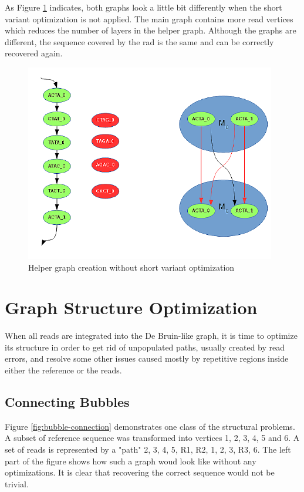As Figure \ref{fig:helper-graph} indicates, both graphs look a little bit differently when the short variant optimization is not applied. The main graph contains more read vertices which reduces the number of layers in the helper graph. Although the graphs are different, the sequence covered by the rad is the same and can be correctly recovered again.

\begin{figure}[h]
	\centering
	\includegraphics{img/helper-graph.pdf}
	\caption{Helper graph creation without short variant optimization}
	\label{fig:helper-graph}
\end{figure}

\section{Graph Structure Optimization}
\label{sec:graph-structure-optimization}

When all reads are integrated into the De Bruin-like graph, it is time to optimize its structure in order to get rid of unpopulated paths, usually created by read errors, and resolve some other issues caused mostly by repetitive regions inside either the reference or the reads.

\subsection{Connecting Bubbles}
\label{subsec:connecting-bubbles}

Figure \ref{fig:bubble-connection} demonstrates one class of the structural problems. A subset of reference sequence was transformed into vertices 1, 2, 3, 4, 5 and 6. A set of reads is represented by a "path" 2, 3, 4, 5, R1, R2, 1, 2, 3, R3, 6.  The left part of the figure shows how such a graph woud look like without any optimizations. It is clear that recovering the correct sequence would not be trivial. 

